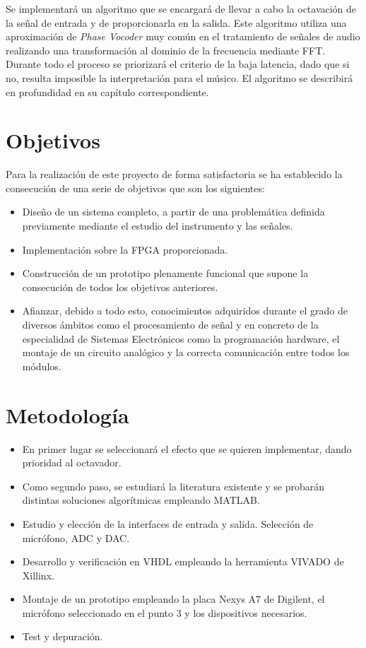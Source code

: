 Se implementará un algoritmo que se encargará de llevar a cabo la octavación de la señal de entrada y de proporcionarla en la salida. Este algoritmo utiliza una aproximación de \emph{Phase Vocoder} muy común en el tratamiento de señales de audio realizando una transformación al dominio de la frecuencia mediante FFT. Durante todo el proceso se priorizará el criterio de la baja latencia, dado que si no, resulta imposible la interpretación para el músico. El algoritmo se describirá en profundidad en su capítulo correspondiente.

\section{Objetivos}
Para la realización de este proyecto de forma satisfactoria se ha establecido la consecución de una serie de objetivos que son los siguientes:
\begin{itemize}
\item Diseño de un sistema completo, a partir de una problemática definida previamente mediante el estudio del instrumento y las señales.
\item Implementación sobre la FPGA proporcionada.
\item Construcción de un prototipo plenamente funcional que supone la consecución de todos los objetivos anteriores.
\item Afianzar, debido a todo esto, conocimientos adquiridos durante el grado de diversos ámbitos como el procesamiento de señal y en concreto de la especialidad de Sistemas Electrónicos como la programación hardware, el montaje de un circuito analógico y la correcta comunicación entre todos los módulos.
\end{itemize}

\section{Metodología}
\begin{itemize}
\item En primer lugar se seleccionará el efecto que se quieren implementar, dando prioridad al octavador.
\item Como segundo paso, se estudiará la literatura existente y se probarán distintas soluciones algorítmicas empleando MATLAB.
\item Estudio y elección de la interfaces de entrada y salida. Selección de micrófono, ADC y DAC.
\item Desarrollo y verificación en VHDL empleando la herramienta VIVADO de Xillinx.
\item Montaje de un prototipo empleando la placa Nexys A7 de Digilent, el micrófono seleccionado en el punto 3 y los dispositivos necesarios.
\item Test y depuración.
\end{itemize}